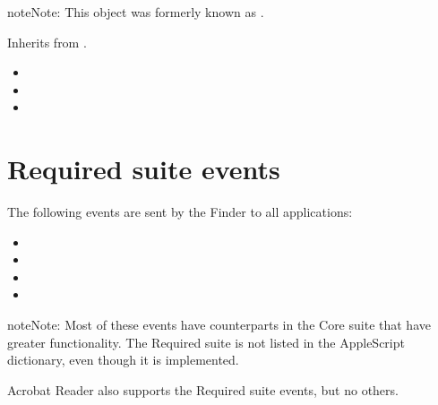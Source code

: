 \documentclass[letterpaper,12pt,english,openany,oneside]{sphinxmanual}
\begin{document}
\begin{sphinxadmonition}{note}{Note:}
This object was formerly known as .
\end{sphinxadmonition}


Inherits from  .

\label{\detokenize{IAC_API_AppleEvtObjects:related-methods-12}}
\begin{itemize}
\item {} 

\item {} 

\item {} 

\end{itemize}


\section{Required suite events}
\label{\detokenize{IAC_API_AppleEvtObjects:required-suite-events}}
The following events are sent by the Finder to all applications:
\begin{itemize}
\item {} 

\item {} 

\item {} 

\item {} 

\end{itemize}

\begin{sphinxadmonition}{note}{Note:}
Most of these events have counterparts in the Core suite that have greater functionality. The Required suite is not listed in the AppleScript dictionary, even though it is implemented.
\end{sphinxadmonition}

Acrobat Reader also supports the Required suite events, but no others.
\end{document}

